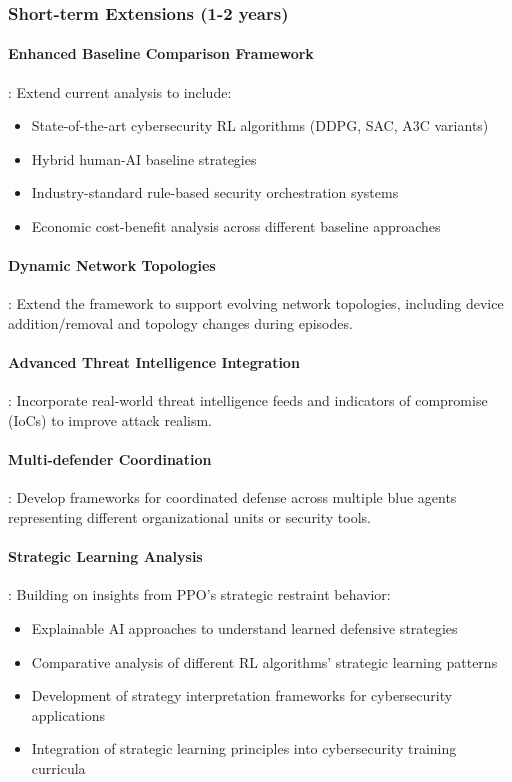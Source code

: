 \documentclass[12pt,oneside]{article}
\begin{document}
\subsubsection{Short-term Extensions (1-2 years)}

\paragraph{Enhanced Baseline Comparison Framework}: Extend current analysis to include:
\begin{itemize}
\item State-of-the-art cybersecurity RL algorithms (DDPG, SAC, A3C variants)
\item Hybrid human-AI baseline strategies
\item Industry-standard rule-based security orchestration systems
\item Economic cost-benefit analysis across different baseline approaches
\end{itemize}

\paragraph{Dynamic Network Topologies}: Extend the framework to support evolving network topologies, including device addition/removal and topology changes during episodes.

\paragraph{Advanced Threat Intelligence Integration}: Incorporate real-world threat intelligence feeds and indicators of compromise (IoCs) to improve attack realism.

\paragraph{Multi-defender Coordination}: Develop frameworks for coordinated defense across multiple blue agents representing different organizational units or security tools.

\paragraph{Strategic Learning Analysis}: Building on insights from PPO's strategic restraint behavior:
\begin{itemize}
\item Explainable AI approaches to understand learned defensive strategies
\item Comparative analysis of different RL algorithms' strategic learning patterns
\item Development of strategy interpretation frameworks for cybersecurity applications
\item Integration of strategic learning principles into cybersecurity training curricula
\end{itemize}
\end{document}
